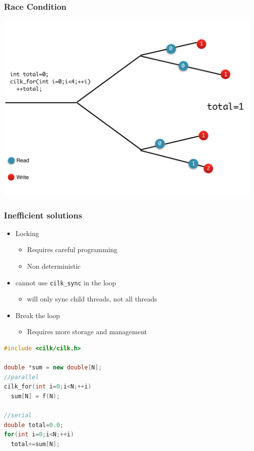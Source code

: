 \documentclass[fleqn,xcolor=table,10pt,final]{beamer}
\begin{document}
\begin{frame}
  \frametitle{Race Condition}
  \includegraphics[width=\textwidth]{figures/race}
\end{frame}

\begin{frame}[fragile]
  \frametitle{Inefficient solutions}
  \begin{itemize}
    \itemsep 0.4cm
    \item Locking
      \begin{itemize}
        \item Requires careful programming
        \item Non deterministic
      \end{itemize}
    \item cannot use {\tt cilk\_sync} in the loop
      \begin{itemize}
        \item will only sync child threads, not all threads
      \end{itemize}
    \item Break the loop
      \begin{itemize}
        \item Requires more storage and management
      \end{itemize}
  \end{itemize}
  \begin{lstlisting}[language=C++,basicstyle=\scriptsize]
#include <cilk/cilk.h>

double *sum = new double[N];
//parallel
cilk_for(int i=0;i<N;++i)
  sum[N] = f(N);

//serial
double total=0.0;
for(int i=0;i<N;++i)
  total+=sum[N];
  \end{lstlisting}
\end{frame}
\end{document}
